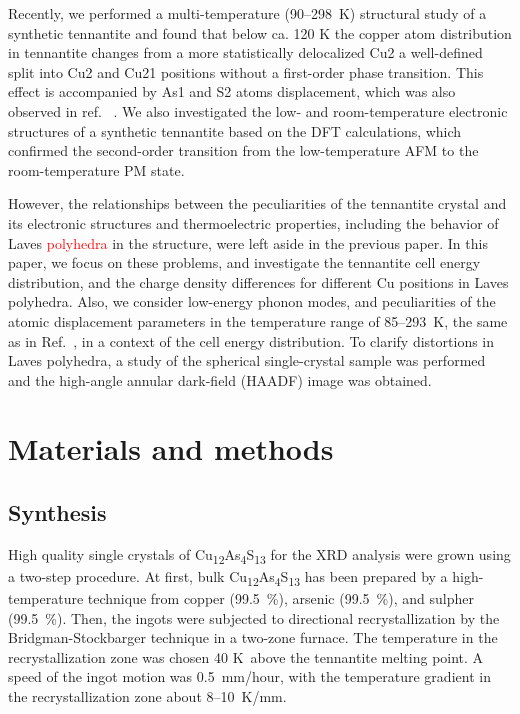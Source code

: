 \documentclass[preprint,review,12pt]{elsarticle}
\begin{document}
Recently, we performed a multi-temperature (90--298~K) structural study of a synthetic tennantite\cite{yaroslavzev2019} and found that below ca. 120 K the copper atom distribution in tennantite changes from a more statistically delocalized Cu2 a well-defined split into Cu2 and Cu21 positions without a first-order phase transition.
This effect is accompanied by As1 and S2 atoms displacement, which was also observed in ref.~ \cite{Hathwar2019}.
We also investigated the low- and room-temperature electronic structures of a synthetic tennantite based on the DFT calculations, which confirmed the second-order transition from the low-temperature AFM to the room-temperature PM state\cite{yaroslavzev2019}.

However, the relationships between the peculiarities of the tennantite crystal and its electronic structures and thermoelectric properties, including the behavior of Laves \textcolor{red}{polyhedra} in the structure, were left aside in the previous paper\cite{yaroslavzev2019}.
In this paper, we focus on these problems, and  investigate the tennantite cell energy distribution, and the charge density differences for different Cu positions in Laves polyhedra.
Also, we consider low-energy phonon modes, and peculiarities of the atomic displacement parameters in the temperature range of 85--293~K, the same as in Ref.~\cite{Dudka2019}, in a context of the cell energy distribution.
To clarify distortions in Laves polyhedra, a study of the spherical single-crystal sample was performed and the high-angle annular dark-field (HAADF) image was obtained.


\section{Materials and methods}\label{sec:level1}
\subsection{Synthesis}\label{sec:level2}

High quality single crystals of Cu\textsubscript{12}As\textsubscript{4}S\textsubscript{13} for the XRD analysis were grown using a two-step procedure. At first, bulk Cu\textsubscript{12}As\textsubscript{4}S\textsubscript{13} has been prepared by a high-temperature technique from copper (99.5~\%), arsenic (99.5~\%), and sulpher (99.5~\%).
Then, the ingots were subjected to directional recrystallization by the Bridgman-Stockbarger technique in a two-zone furnace.
The temperature in the recrystallization zone was chosen 40 K~above the tennantite melting point. A speed of the  ingot motion was 0.5~mm/hour, with the temperature gradient in the recrystallization zone about 8--10~K/mm.
\end{document}
